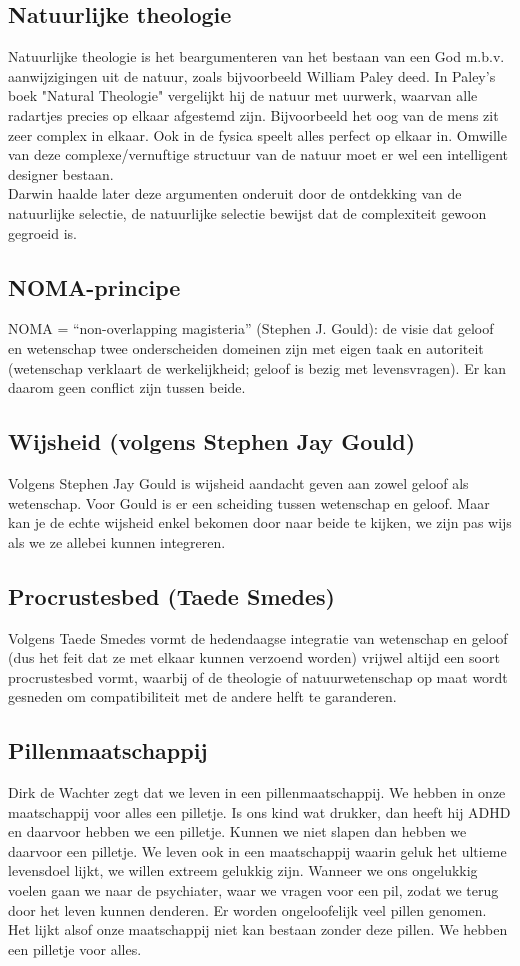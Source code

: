 \documentclass[11pt,a4paper,titlepage]{article}
\begin{document}
\subsection{Natuurlijke theologie }
Natuurlijke theologie is het beargumenteren van het bestaan van een God m.b.v. aanwijzigingen uit de natuur, zoals bijvoorbeeld William Paley deed. In Paley's boek "Natural Theologie" vergelijkt hij de natuur met uurwerk, waarvan alle radartjes precies op elkaar afgestemd zijn. Bijvoorbeeld het oog van de mens zit zeer complex in elkaar.  Ook in de fysica speelt alles perfect op elkaar in. Omwille van deze complexe/vernuftige structuur van de natuur moet er wel een intelligent designer bestaan. \\ Darwin haalde later deze argumenten onderuit door de ontdekking van de natuurlijke selectie, de natuurlijke selectie bewijst dat de complexiteit gewoon gegroeid is.

\subsection{NOMA-principe}
NOMA = “non-overlapping magisteria” (Stephen J. Gould): de visie dat geloof en wetenschap twee onderscheiden domeinen zijn met eigen taak en autoriteit (wetenschap verklaart de werkelijkheid; geloof is bezig met levensvragen). Er kan daarom geen conflict zijn tussen beide.

\subsection{Wijsheid (volgens Stephen Jay Gould)}
Volgens Stephen Jay Gould is wijsheid aandacht geven aan zowel geloof als wetenschap. Voor Gould is er een scheiding tussen wetenschap en geloof. Maar kan je de echte wijsheid enkel bekomen door naar beide te kijken, we zijn pas wijs als we ze allebei kunnen integreren.

\subsection{Procrustesbed (Taede Smedes)}
Volgens Taede Smedes vormt de hedendaagse integratie van wetenschap en geloof (dus het feit dat ze met elkaar kunnen verzoend worden) vrijwel altijd een
soort procrustesbed vormt, waarbij of de theologie of natuurwetenschap op maat wordt gesneden om compatibiliteit met de andere helft te garanderen.

\subsection{Pillenmaatschappij}
Dirk de Wachter zegt dat we leven in een pillenmaatschappij. We hebben in onze maatschappij voor alles een pilletje. Is ons kind wat drukker, dan heeft hij ADHD en daarvoor hebben we een pilletje. Kunnen we niet slapen dan hebben we daarvoor een pilletje. We leven ook in een maatschappij waarin geluk het ultieme levensdoel lijkt, we willen extreem gelukkig zijn. Wanneer we ons ongelukkig voelen gaan we naar de psychiater, waar we vragen voor een pil, zodat we terug door het leven kunnen denderen. Er worden ongeloofelijk veel pillen genomen. Het lijkt alsof onze maatschappij niet kan bestaan zonder deze pillen. We hebben een pilletje voor alles.
\end{document}
